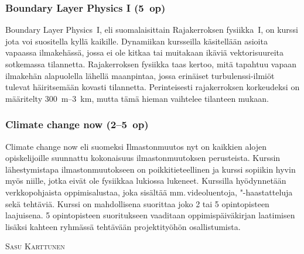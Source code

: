 \documentclass[../ala_hataile.tex]{subfiles}
\begin{document}
\subsubsection*{Boundary Layer Physics I (5~op)}
Boundary Layer Physics~I, eli suomalaisittain Rajakerroksen fysiikka~I, on kurssi jota voi suositella
kyllä kaikille. Dynamiikan kursseilla käsitellään asioita
vapaassa ilmakehässä, jossa ei ole kitkaa
tai muitakaan ikäviä vektorisuureita sotkemassa
tilannetta. Rajakerroksen fysiikka
taas kertoo, mitä tapahtuu vapaan
ilmakehän alapuolella lähellä maanpintaa,
jossa erinäiset turbulenssi-ilmiöt tulevat
häiritsemään kovasti tilannetta. Perinteisesti
rajakerroksen korkeudeksi on määritelty
300~m--3~km, mutta tämä hieman vaihtelee tilanteen
mukaan.

\subsubsection*{Climate change now (2--5~op)}
Climate change now eli suomeksi Ilmastonmuutos nyt on kaikkien alojen opiskelijoille suunnattu kokonaisuus ilmastonmuutoksen perusteista. Kurssin lähestymistapa ilmastonmuutokseen on poikkitieteellinen ja kurssi sopiikin hyvin myös niille, jotka eivät ole fysiikkaa lukiossa lukeneet. Kurssilla hyödynnetään verkkopohjaista oppimisalustaa, joka sisältää mm.\,videoluentoja, "-haastatteluja sekä tehtäviä. Kurssi on mahdollisena suorittaa joko 2 tai 5 opintopisteen laajuisena. 5 opintopisteen suoritukseen vaaditaan oppimispäiväkirjan laatimisen lisäksi kahteen ryhmässä tehtävään projektityöhön osallistumista.

\vspace{0.5cm}
\noindent\textsc{Sasu Karttunen}
\end{document}
